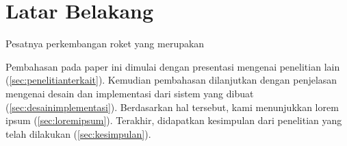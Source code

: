 \section{Latar Belakang}
\label{sec:latarbelakang}


Pesatnya perkembangan roket yang merupakan \lipsum[2-4]

Pembahasan pada paper ini dimulai dengan presentasi mengenai penelitian lain (\cref{sec:penelitianterkait}).
Kemudian pembahasan dilanjutkan dengan penjelasan mengenai desain dan implementasi dari sistem yang dibuat (\cref{sec:desainimplementasi}).
Berdasarkan hal tersebut, kami menunjukkan lorem ipsum (\cref{sec:loremipsum}).
Terakhir, didapatkan kesimpulan dari penelitian yang telah dilakukan (\cref{sec:kesimpulan}).
